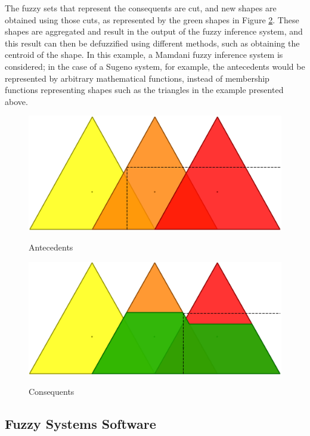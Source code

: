The fuzzy sets that represent the consequents are cut, and new shapes are obtained using those cuts, as represented by the green shapes in Figure \ref{figure:consequents}. These shapes are aggregated and result in the output of the fuzzy inference system, and this result can then be defuzzified using different methods, such as obtaining the centroid of the shape. In this example, a Mamdani fuzzy inference system is considered; in the case of a Sugeno system, for example, the antecedents would be represented by arbitrary mathematical functions, instead of membership functions representing shapes such as the triangles in the example presented above.

\begin{figure}
\caption{Antecedents}
\centering
\includegraphics[width=1.0\textwidth]{img/antecedents.png}
\label{figure:antecedents}
\end{figure}

\begin{figure}
\caption{Consequents}
\centering
\includegraphics[width=1.0\textwidth]{img/consequents.png}
\label{figure:consequents}
\end{figure}

\subsection{Fuzzy Systems Software}
\label{subsection:fuzzy-systems-software}

